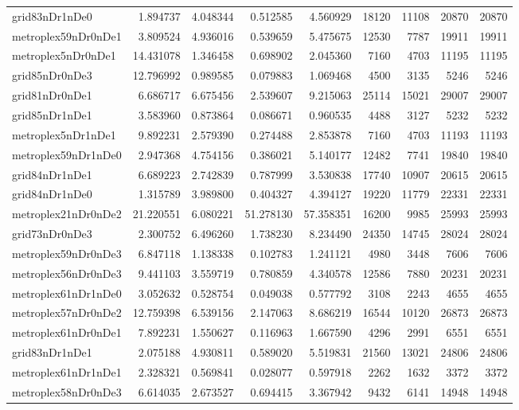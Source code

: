 \begin{longtable}{|l|r|r|r|r|r|r|r|r|}
grid83nDr1nDe0 & 1.894737 & 4.048344 & 0.512585 & 4.560929 & 18120 & 11108 & 20870 & 20870 \\
metroplex59nDr0nDe1 & 3.809524 & 4.936016 & 0.539659 & 5.475675 & 12530 & 7787 & 19911 & 19911 \\
metroplex5nDr0nDe1 & 14.431078 & 1.346458 & 0.698902 & 2.045360 & 7160 & 4703 & 11195 & 11195 \\
grid85nDr0nDe3 & 12.796992 & 0.989585 & 0.079883 & 1.069468 & 4500 & 3135 & 5246 & 5246 \\
grid81nDr0nDe1 & 6.686717 & 6.675456 & 2.539607 & 9.215063 & 25114 & 15021 & 29007 & 29007 \\
grid85nDr1nDe1 & 3.583960 & 0.873864 & 0.086671 & 0.960535 & 4488 & 3127 & 5232 & 5232 \\
metroplex5nDr1nDe1 & 9.892231 & 2.579390 & 0.274488 & 2.853878 & 7160 & 4703 & 11193 & 11193 \\
metroplex59nDr1nDe0 & 2.947368 & 4.754156 & 0.386021 & 5.140177 & 12482 & 7741 & 19840 & 19840 \\
grid84nDr1nDe1 & 6.689223 & 2.742839 & 0.787999 & 3.530838 & 17740 & 10907 & 20615 & 20615 \\
grid84nDr1nDe0 & 1.315789 & 3.989800 & 0.404327 & 4.394127 & 19220 & 11779 & 22331 & 22331 \\
metroplex21nDr0nDe2 & 21.220551 & 6.080221 & 51.278130 & 57.358351 & 16200 & 9985 & 25993 & 25993 \\
grid73nDr0nDe3 & 2.300752 & 6.496260 & 1.738230 & 8.234490 & 24350 & 14745 & 28024 & 28024 \\
metroplex59nDr0nDe3 & 6.847118 & 1.138338 & 0.102783 & 1.241121 & 4980 & 3448 & 7606 & 7606 \\
metroplex56nDr0nDe3 & 9.441103 & 3.559719 & 0.780859 & 4.340578 & 12586 & 7880 & 20231 & 20231 \\
metroplex61nDr1nDe0 & 3.052632 & 0.528754 & 0.049038 & 0.577792 & 3108 & 2243 & 4655 & 4655 \\
metroplex57nDr0nDe2 & 12.759398 & 6.539156 & 2.147063 & 8.686219 & 16544 & 10120 & 26873 & 26873 \\
metroplex61nDr0nDe1 & 7.892231 & 1.550627 & 0.116963 & 1.667590 & 4296 & 2991 & 6551 & 6551 \\
grid83nDr1nDe1 & 2.075188 & 4.930811 & 0.589020 & 5.519831 & 21560 & 13021 & 24806 & 24806 \\
metroplex61nDr1nDe1 & 2.328321 & 0.569841 & 0.028077 & 0.597918 & 2262 & 1632 & 3372 & 3372 \\
metroplex58nDr0nDe3 & 6.614035 & 2.673527 & 0.694415 & 3.367942 & 9432 & 6141 & 14948 & 14948 \\

\end{longtable}
